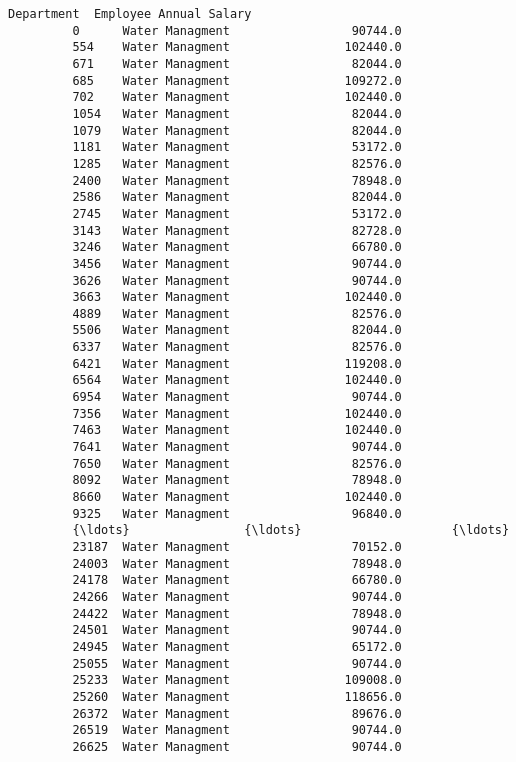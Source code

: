\documentclass[11pt]{article}
\begin{document}
\begin{Verbatim}[commandchars=\\\{\}]
                     Department  Employee Annual Salary  
         0      Water Managment                 90744.0  
         554    Water Managment                102440.0  
         671    Water Managment                 82044.0  
         685    Water Managment                109272.0  
         702    Water Managment                102440.0  
         1054   Water Managment                 82044.0  
         1079   Water Managment                 82044.0  
         1181   Water Managment                 53172.0  
         1285   Water Managment                 82576.0  
         2400   Water Managment                 78948.0  
         2586   Water Managment                 82044.0  
         2745   Water Managment                 53172.0  
         3143   Water Managment                 82728.0  
         3246   Water Managment                 66780.0  
         3456   Water Managment                 90744.0  
         3626   Water Managment                 90744.0  
         3663   Water Managment                102440.0  
         4889   Water Managment                 82576.0  
         5506   Water Managment                 82044.0  
         6337   Water Managment                 82576.0  
         6421   Water Managment                119208.0  
         6564   Water Managment                102440.0  
         6954   Water Managment                 90744.0  
         7356   Water Managment                102440.0  
         7463   Water Managment                102440.0  
         7641   Water Managment                 90744.0  
         7650   Water Managment                 82576.0  
         8092   Water Managment                 78948.0  
         8660   Water Managment                102440.0  
         9325   Water Managment                 96840.0  
         {\ldots}                {\ldots}                     {\ldots}  
         23187  Water Managment                 70152.0  
         24003  Water Managment                 78948.0  
         24178  Water Managment                 66780.0  
         24266  Water Managment                 90744.0  
         24422  Water Managment                 78948.0  
         24501  Water Managment                 90744.0  
         24945  Water Managment                 65172.0  
         25055  Water Managment                 90744.0  
         25233  Water Managment                109008.0  
         25260  Water Managment                118656.0  
         26372  Water Managment                 89676.0  
         26519  Water Managment                 90744.0  
         26625  Water Managment                 90744.0  

\end{Verbatim}
\end{document}
